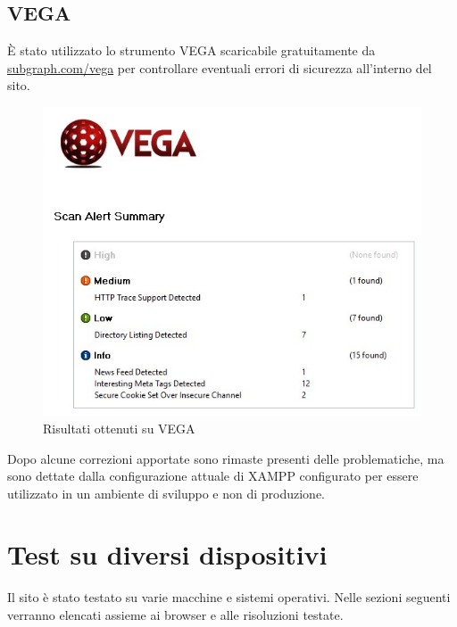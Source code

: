 \documentclass[openany, a4paper, 12pt]{report}
\begin{document}
			\subsection{VEGA}
			\`{E} stato utilizzato lo strumento VEGA scaricabile gratuitamente da \url{subgraph.com/vega} per controllare eventuali errori di sicurezza all'interno del sito.\\
			
			\begin{figure}[H]
				\centering
				\includegraphics[width=0.8\linewidth]{images/VEGA}
				\caption{Risultati ottenuti su VEGA}
			\end{figure}
			Dopo alcune correzioni apportate sono rimaste presenti delle problematiche, ma sono dettate dalla configurazione attuale di XAMPP configurato per essere utilizzato in un ambiente di sviluppo e non di produzione.

		\section{Test su diversi dispositivi}
			Il sito è stato testato su varie macchine e sistemi operativi. Nelle sezioni seguenti verranno elencati assieme ai browser e alle risoluzioni testate.
\end{document}
